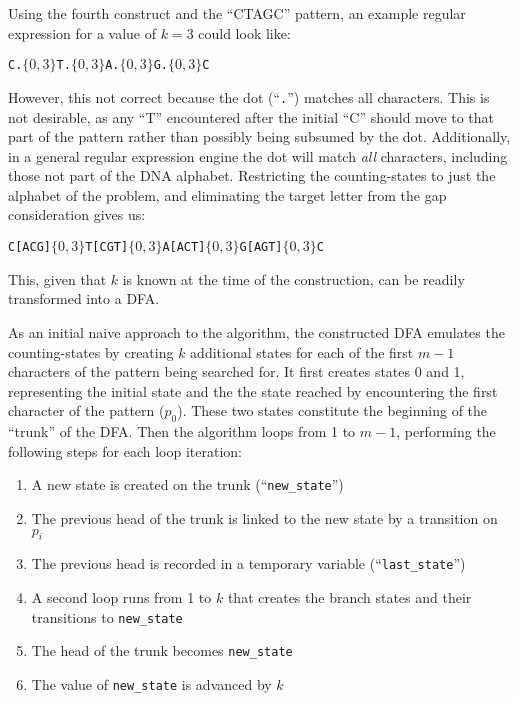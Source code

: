 Using the fourth construct and the ``CTAGC'' pattern, an example regular expression for a value of $k = 3$ could look like:

\begin{center}
\texttt{C.$\lbrace 0,3 \rbrace$T.$\lbrace 0,3 \rbrace$A.$\lbrace 0,3 \rbrace$G.$\lbrace 0,3 \rbrace$C}
\end{center}

However, this not correct because the dot (``\texttt{.}'') matches all characters. This is not desirable, as any ``T'' encountered after the initial ``C'' should move to that part of the pattern rather than possibly being subsumed by the dot. Additionally, in a general regular expression engine the dot will match \textit{all} characters, including those not part of the DNA alphabet. Restricting the counting-states to just the alphabet of the problem, and eliminating the target letter from the gap consideration gives us:

\begin{center}
\texttt{C[ACG]$\lbrace 0,3 \rbrace$T[CGT]$\lbrace 0,3 \rbrace$A[ACT]$\lbrace 0,3 \rbrace$G[AGT]$\lbrace 0,3 \rbrace$C}
\end{center}

This, given that $k$ is known at the time of the construction, can be readily transformed into a DFA.

As an initial naive approach to the algorithm, the constructed DFA emulates the counting-states by creating $k$ additional states for each of the first $m - 1$ characters of the pattern being searched for. It first creates states 0 and 1, representing the initial state and the the state reached by encountering the first character of the pattern ($p_0$). These two states constitute the beginning of the ``trunk'' of the DFA. Then the algorithm loops from 1 to $m-1$, performing the following steps for each loop iteration:

\begin{enumerate}
\item A new state is created on the trunk (``\texttt{new\_state}'')
\item The previous head of the trunk is linked to the new state by a transition on $p_i$
\item The previous head is recorded in a temporary variable (``\texttt{last\_state}'')
\item A second loop runs from 1 to $k$ that creates the branch states and their transitions to \texttt{new\_state}
\item The head of the trunk becomes \texttt{new\_state}
\item The value of \texttt{new\_state} is advanced by $k$
\end{enumerate}


